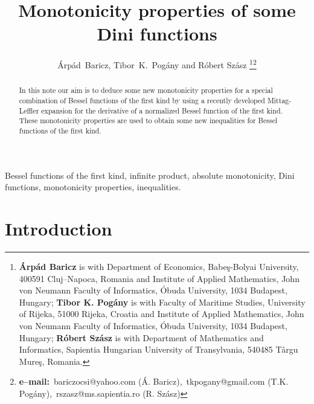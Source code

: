 \documentclass[journal]{IEEEtran}
\begin{document}
\title{Monotonicity properties of some Dini functions}

\author{\'Arp\'ad~Baricz, Tibor~K.~Pog\'any and R\'obert Sz\'asz
\thanks{{\bf \'Arp\'ad Baricz} is with Department of Economics, Babe\c{s}-Bolyai University, 400591 Cluj--Napoca, Romania and Institute of Applied Mathematics, John von Neumann Faculty of Informatics, \'Obuda University, 1034 Budapest, Hungary; {\bf Tibor K. Pog\'any} is with Faculty of Maritime Studies, University of Rijeka, 51000 Rijeka, Croatia and Institute of Applied Mathematics, John von Neumann Faculty of Informatics, \'Obuda University, 1034 Budapest, Hungary; {\bf R\'obert Sz\'asz} is with Department of Mathematics and Informatics, Sapientia Hungarian University of Transylvania, 540485 T\^argu Mure\c{s}, Romania.}\thanks{{\bf e--mail:}~{bariczocsi@yahoo.com} (\'A. Baricz),~{tkpogany@gmail.com} (T.K. Pog\'any),~{rszasz@ms.sapientia.ro} (R. Sz\'asz)}}


\maketitle

\begin{abstract}
In this note our aim is to deduce some new monotonicity properties for a special combination of Bessel functions of the first kind by using a recently developed Mittag-Leffler expansion for the derivative of a normalized Bessel function of the first kind. These monotonicity properties are used to obtain some new inequalities for Bessel functions of the first kind.
\end{abstract}

\begin{IEEEkeywords}
Bessel functions of the first kind, infinite product, absolute monotonicity, Dini functions, monotonicity properties, inequalities.
\end{IEEEkeywords}

\section{Introduction}
\end{document}

